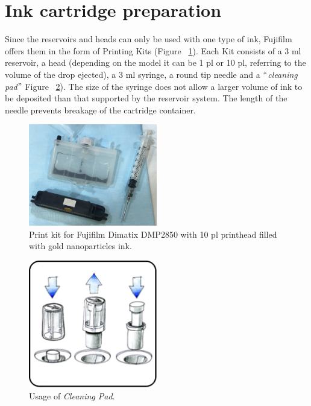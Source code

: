 \section{Ink cartridge preparation}
Since the reservoirs and heads can only be used with one type of ink, Fujifilm offers them in the form of Printing Kits (Figure ~\ref{fig:Figura_kit_impresion}). Each Kit consists of a 3 ml reservoir, a head (depending on the model it can be 1 pl or 10 pl, referring to the volume of the drop ejected), a 3 ml syringe, a round tip needle and a $``$\textit{cleaning pad}$"$ Figure ~\ref{fig:Figura_Cleaning_pad}). The size of the syringe does not allow a larger volume of ink to be deposited than that supported by the reservoir system. The length of the needle prevents breakage of the cartridge container.

\begin{figure}[H]
  \centering
    \includegraphics[width=0.5\textwidth]{Figures/Figura_kit_impresion}
  \caption{Print kit for Fujifilm Dimatix DMP2850 with 10 pl printhead filled with gold nanoparticles ink.}
  \label{fig:Figura_kit_impresion}
\end{figure}

\begin{figure}[H]
  \centering
    \includegraphics[width=0.5\textwidth]{Figures/Figura_Cleaning_pad}
  \caption{Usage of \textit{Cleaning Pad}.}
  \label{fig:Figura_Cleaning_pad}
\end{figure}

